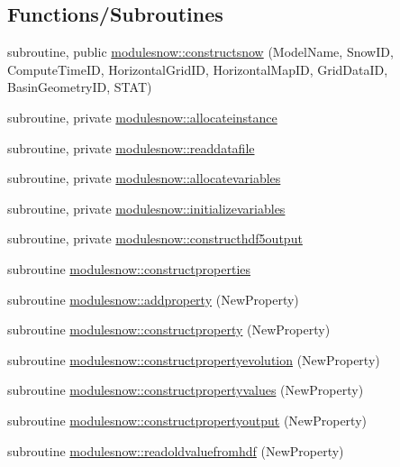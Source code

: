 \subsection*{Functions/\+Subroutines}
\begin{DoxyCompactItemize}
\item 
subroutine, public \mbox{\hyperlink{namespacemodulesnow_af7722587c67638fd4a4d05e998e957b0}{modulesnow\+::constructsnow}} (Model\+Name, Snow\+ID, Compute\+Time\+ID, Horizontal\+Grid\+ID, Horizontal\+Map\+ID, Grid\+Data\+ID, Basin\+Geometry\+ID, S\+T\+AT)
\item 
subroutine, private \mbox{\hyperlink{namespacemodulesnow_a752062220e47eb96c5b9ecdc75609c34}{modulesnow\+::allocateinstance}}
\item 
subroutine, private \mbox{\hyperlink{namespacemodulesnow_a6ca0e43e3af7be1542e8e61ec1d6d7b6}{modulesnow\+::readdatafile}}
\item 
subroutine, private \mbox{\hyperlink{namespacemodulesnow_a82db750ad87b4aa5ce786f1d63a4f901}{modulesnow\+::allocatevariables}}
\item 
subroutine, private \mbox{\hyperlink{namespacemodulesnow_a9e1c37918173cd2c259cbdae24b7e9bc}{modulesnow\+::initializevariables}}
\item 
subroutine, private \mbox{\hyperlink{namespacemodulesnow_a6d044212a6e9ba902389a391f8494f53}{modulesnow\+::constructhdf5output}}
\item 
subroutine \mbox{\hyperlink{namespacemodulesnow_a5906c8b8cc45f1a2cbb5a702d0d4aecc}{modulesnow\+::constructproperties}}
\item 
subroutine \mbox{\hyperlink{namespacemodulesnow_ab95e7de76c7c2b25d88721edc294e518}{modulesnow\+::addproperty}} (New\+Property)
\item 
subroutine \mbox{\hyperlink{namespacemodulesnow_a1ebff32e94c1fd5415eb41bb77f7b10a}{modulesnow\+::constructproperty}} (New\+Property)
\item 
subroutine \mbox{\hyperlink{namespacemodulesnow_ac9ddc053b9b4396306dc907dad5c1c95}{modulesnow\+::constructpropertyevolution}} (New\+Property)
\item 
subroutine \mbox{\hyperlink{namespacemodulesnow_a6599173ecfbf81367f1afdb4ac9a5c81}{modulesnow\+::constructpropertyvalues}} (New\+Property)
\item 
subroutine \mbox{\hyperlink{namespacemodulesnow_a70bdbf0fe6f049a855b8643892b060a2}{modulesnow\+::constructpropertyoutput}} (New\+Property)
\item 
subroutine \mbox{\hyperlink{namespacemodulesnow_af891ed4f018c66ced7868c95013229f2}{modulesnow\+::readoldvaluefromhdf}} (New\+Property)

\end{DoxyCompactItemize}
